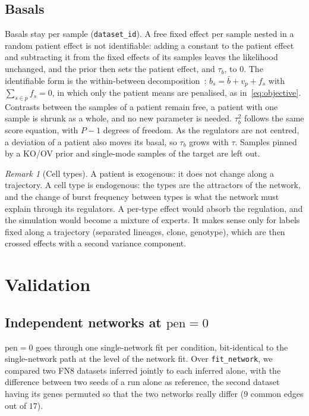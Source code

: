 \documentclass[a4paper, 11pt]{article}
\newcommand{\pen}{\mathrm{pen}}
\theoremstyle{plain}
\theoremstyle{remark}
\newtheorem{rem}{Remark}
\begin{document}
\subsection{Basals}\label{sec:basal}

Basals stay per sample (\texttt{dataset\_id}). A free fixed effect per sample nested in a random patient effect is not identifiable: adding a constant to the patient effect and subtracting it from the fixed effects of its samples leaves the likelihood unchanged, and the prior then sets the patient effect, and $\tau_b$, to $0$. The identifiable form is the within-between decomposition~\cite{mundlak1978pooling}: $b_s = \bar b + v_p + f_s$ with $\sum_{s \in p} f_s = 0$, in which only the patient means are penalised, as in~\eqref{eq:objective}. Contrasts between the samples of a patient remain free, a patient with one sample is shrunk as a whole, and no new parameter is needed. $\tau_b^2$ follows the same score equation, with $P - 1$ degrees of freedom. As the regulators are not centred, a deviation of a patient also moves its basal, so $\tau_b$ grows with $\tau$. Samples pinned by a KO/OV prior and single-mode samples of the target are left out.

\begin{rem}[Cell types]
A patient is exogenous: it does not change along a trajectory. A cell type is endogenous: the types are the attractors of the network, and the change of burst frequency between types is what the network must explain through its regulators. A per-type effect would absorb the regulation, and the simulation would become a mixture of experts. It makes sense only for labels fixed along a trajectory (separated lineages, clone, genotype), which are then crossed effects with a second variance component.
\end{rem}

\section{Validation}\label{sec:validation}

\subsection{Independent networks at $\pen = 0$}

$\pen = 0$ goes through one single-network fit per condition, bit-identical to the single-network path at the level of the network fit. Over \texttt{fit\_network}, we compared two FN8 datasets inferred jointly to each inferred alone, with the difference between two seeds of a run alone as reference, the second dataset having its genes permuted so that the two networks really differ ($9$ common edges out of $17$).
\end{document}

